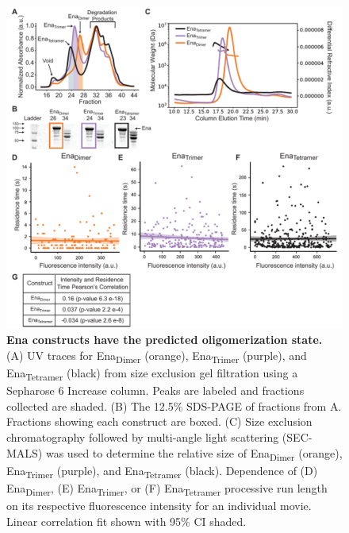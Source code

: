 \begin{figure}
\centering
\includegraphics[width=\textwidth]{img/ch02/Supp_Figure_2_PNAS.pdf}
\caption[Ena constructs have the predicted oligomerization state.]{\textbf{Ena constructs have the predicted oligomerization state.} (A) UV traces for Ena\textsubscript{Dimer} (orange), Ena\textsubscript{Trimer} (purple), and Ena\textsubscript{Tetramer} (black) from size exclusion gel filtration using a Sepharose 6 Increase column. Peaks are labeled and fractions collected are shaded. (B) The 12.5\% SDS-PAGE of fractions from A. Fractions showing each construct are boxed. (C) Size exclusion chromatography followed by multi-angle light scattering (SEC-MALS) was used to determine the relative size of Ena\textsubscript{Dimer} (orange), Ena\textsubscript{Trimer} (purple), and Ena\textsubscript{Tetramer} (black). Dependence of (D) Ena\textsubscript{Dimer}, (E) Ena\textsubscript{Trimer}, or (F) Ena\textsubscript{Tetramer} processive run length on its respective fluorescence intensity for an individual movie. Linear correlation fit shown with 95\% CI shaded.}
\label{fig:ena-sizes}
\end{figure}

\begin{figure}[!htb]
\end{figure}


